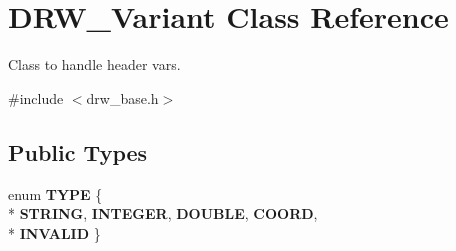 \hypertarget{classDRW__Variant}{\section{D\-R\-W\-\_\-\-Variant Class Reference}
\label{classDRW__Variant}
}


Class to handle header vars.  




{\ttfamily \#include $<$drw\-\_\-base.\-h$>$}

\subsection*{Public Types}
\begin{DoxyCompactItemize}
\item 
enum {\bfseries T\-Y\-P\-E} \{ \\*
{\bfseries S\-T\-R\-I\-N\-G}, 
{\bfseries I\-N\-T\-E\-G\-E\-R}, 
{\bfseries D\-O\-U\-B\-L\-E}, 
{\bfseries C\-O\-O\-R\-D}, 
\\*
{\bfseries I\-N\-V\-A\-L\-I\-D}
 \}
\end{DoxyCompactItemize}
